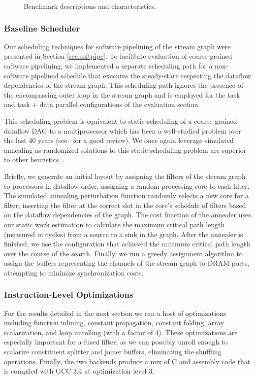 \begin{figure*}[t]
\centering
{}
\caption{Benchmark descriptions and characteristics.
\protect\label{fig:benchchar}}
\vspace{-6pt}
\end{figure*}

\subsubsection{Baseline Scheduler}
Our scheduling techniques for software pipelining of the stream graph
were presented in Section \ref{sec:softpipe}.  To facilitate
evaluation of coarse-grained software pipelining, we implemented a
separate scheduling path for a non-software pipelined schedule that
executes the steady-state respecting the dataflow dependencies of the
stream graph.  This scheduling path ignores the presence of the
encompassing outer loop in the stream graph and is employed for the
task and task + data parallel configurations of the evaluation section.

This scheduling problem is equivalent to static scheduling of a
coarse-grained dataflow DAG to a multiprocessor which has been a
well-studied problem over the last 40 years (see~\cite{DAGSched} for a
good review).  We once again leverage simulated annealing as
randomized solutions to this static scheduling problem are superior to
other heuristics~\cite{kwok99fastest}.

Briefly, we generate an initial layout by assigning the filters of the
stream graph to processors in dataflow order, assigning a random
processing core to each filter. The simulated annealing perturbation
function randomly selects a new core for a filter, inserting the
filter at the correct slot in the core's schedule of filters based on
the dataflow dependencies of the graph.  The cost function of the
annealer uses our static work estimation to calculate the maximum
critical path length (measured in cycles) from a source to a sink in
the graph.  After the annealer is finished, we use the configuration
that achieved the minimum critical path length over the course of the
search.  Finally, we run a greedy assignment algorithm to assign the
buffers representing the channels of the stream graph to DRAM ports,
attempting to minimize synchronization costs.

\subsubsection{Instruction-Level Optimizations}
For the results detailed in the next section we ran a host of
optimizations including function inlining, constant propagation,
constant folding, array scalarization, and loop unrolling (with a
factor of 4).  These optimizations are especially important for a
fused filter, as we can possibly unroll enough to scalarize
constituent splitter and joiner buffers, eliminating the shuffling
operations.  Finally, the two backends produce a mix of C and assembly
code that is compiled with GCC 3.4 at optimization level 3.
